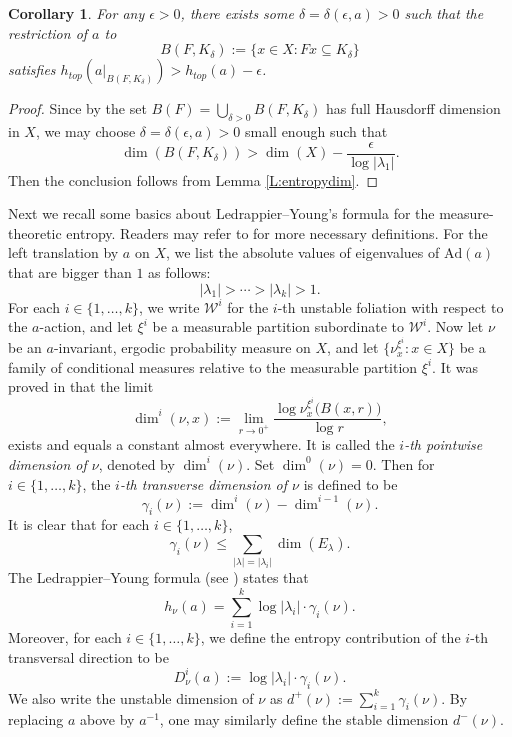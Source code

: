 \documentclass[reqno,12pt]{amsart}
\newtheorem{corollary}[theorem]{Corollary}
\theoremstyle{definition}
\numberwithin{equation}{section}
\newcommand{\cW}{\mathcal{W}}
\newcommand{\Ad}{\mathrm{Ad}}
\newcommand {\comm}[1]   {\textcolor{red}{#1}}
\newcommand {\neww}[1]   {\textcolor{purple}{#1}}
\begin{document}
{\begin{corollary}\label{C:entropydim}
    For any $\epsilon>0$, there exists some $\delta=\delta(\epsilon,a)>0$ such that the restriction of $a$ to \begin{equation*}
        B(F,K_\delta):=\{x\in X: Fx\subseteq K_\delta\}
    \end{equation*} satisfies $h_{top}(a|_{B(F,K_{\delta})})>h_{top}(a)-\epsilon$.
\end{corollary}
\begin{proof}
Since by \cite[Theorem 1.5]{KM96}  the set $B(F)=\bigcup_{\delta>0}B(F,K_\delta)$ has full Hausdorff dimension in $X$, we may choose $\delta=\delta(\epsilon,a)>0$ small enough such that  
$$
\dim(B(F,K_\delta))>\dim(X)-\dfrac{\epsilon}{\log|\lambda_1|}.
$$
Then the conclusion follows from Lemma \ref{L:entropydim}.
\end{proof}

{Next we recall some basics about Ledrappier--Young's formula for the measure-theoretic entropy. Readers may refer to \cite{AB16} for more necessary definitions. For the left translation by $a$ on $X$, we list the absolute values of eigenvalues of $\Ad(a)$ that are bigger than $1$ as follows: $$
|\lambda_1|>\cdots>|\lambda_k|>1.
$$
For each $i\in\{1,\dots,k\}$, we write $\cW^i$ for the $i$-th unstable foliation with respect to the $a$-action, and let $\xi^i$ be a measurable partition subordinate to $\cW^i$. Now let $\nu$ be an $a$-invariant, ergodic probability measure on $X$,}
{and let $\{\nu^{\xi^i}_x:x\in X\}$ be a family of conditional measures relative to the measurable partition $\xi^i$.}
{It was proved in \cite[Sections 7.3 and 10.1]{AB16} that the limit 
$$
\dim^i(\nu,x):=\lim_{r\to 0^+}\frac{\log\nu^{\xi^i}_x\big(B(x,r)\big)}{\log{r}}, 
$$
exists and equals a constant almost everywhere. It is called
the \textit{$i$-th pointwise dimension of $\nu$}, denoted by $\dim^i(\nu)$. Set $\dim^0(\nu)=0$. Then for $i\in\{1,\dots,k\}$, the \textit{$i$-th transverse dimension of $\nu$} is defined to be $$
\gamma_i(\nu):=\dim^i(\nu)-\dim^{i-1}(\nu).
$$
It is clear that for each $i\in\{1,\dots,k\}$, $$\gamma_i(\nu)\leq \sum\limits_{|\lambda|=|\lambda_i|}\dim(E_{\lambda}).$$ The Ledrappier--Young formula (see \cite[Theorem 7.7]{AB16}) states that $$
h_{\nu}(a)=\sum\limits_{i=1}^k\log|\lambda_i|\cdot \gamma_i(\nu).
    $$}
{Moreover, for each $i\in\{1,\dots,k\}$, we define the entropy contribution of the $i$-th transversal direction to be $$D^i_{\nu}(a):=\log|\lambda_i|\cdot \gamma_i(\nu).$$  We also write the unstable dimension of $\nu$ as $d^+(\nu):=\sum\limits_{i=1}^k\gamma_i(\nu)$. By replacing $a$ above by $a^{-1}$, one may similarly define the stable dimension $d^-(\nu)$.}

}
\end{document}
